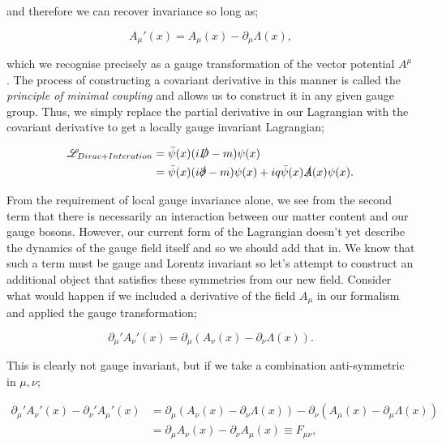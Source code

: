 and therefore we can recover invariance so long as;

\begin{equation}
A_\mu'(x) = A_\mu(x) - \partial_\mu \Lambda(x),
\end{equation}

which we recognise precisely as a gauge transformation of the vector potential $A^\mu$. The process of constructing a covariant derivative in this manner is called the \emph{principle of minimal coupling} and allows us to construct it in any given gauge group. Thus, we simply replace the partial derivative in our Lagrangian with the covariant derivative to get a locally gauge invariant Lagrangian;

\begin{equation}
\begin{split}
\mathscr{L}_{Dirac+Interation} &= \bar{\psi}(x)(i \slashed{D} - m)\psi(x) \\
& = \bar{\psi}(x)(i \slashed{\partial} -m) \psi(x) + i q \bar{\psi}(x) \slashed{A}(x) \psi(x).
\end{split}
\end{equation}

From the requirement of local gauge invariance alone, we see from the second term that there is necessarily an interaction between our matter content and our gauge bosons. However, our current form of the Lagrangian doesn't yet describe the dynamics of the gauge field itself and so we should add that in. We know that such a term must be gauge and Lorentz invariant so let's attempt to construct an additional object that satisfies these symmetries from our new field.  Consider what would happen if we included a derivative of the field $A_\mu$ in our formalism and applied the gauge transformation;

\begin{equation}
\partial_\mu ' A_\nu'  (x) = \partial_\mu (A_\nu(x) - \partial_\nu \Lambda(x)).
\end{equation}

This is clearly not gauge invariant, but if we take a combination anti-symmetric in $\mu,\nu$;

\begin{equation}
\begin{split}
\partial_\mu ' A_\nu' (x) - \partial_\nu' A_\mu'(x) & = \partial_\mu (A_\nu(x) - \partial_\nu \Lambda(x)) -  \partial_\nu (A_\mu(x) - \partial_\mu \Lambda(x)) \\
&= \partial_\mu A_\nu (x) - \partial_\nu A_\mu(x) \equiv F_{\mu \nu}, 
\end{split}
\end{equation}

